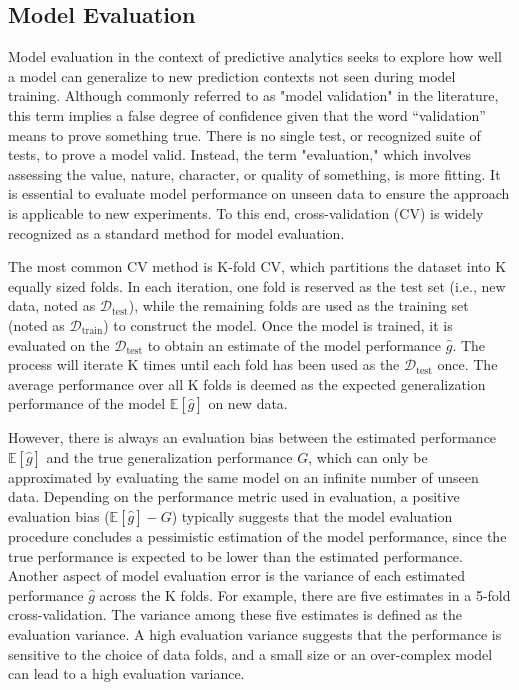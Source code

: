 \subsection{Model Evaluation}

Model evaluation in the context of predictive analytics seeks to explore how well a model can generalize to new prediction contexts not seen during model training. Although commonly referred to as "model validation" in the literature, this term implies a false degree of confidence given that the word “validation” means to prove something true. There is no single test, or recognized suite of tests, to prove a model valid. Instead, the term "evaluation," which involves assessing the value, nature, character, or quality of something, is more fitting. It is essential to evaluate model performance on unseen data to ensure the approach is applicable to new experiments. To this end, cross-validation (CV) is widely recognized as a standard method for model evaluation.

The most common CV method is K-fold CV, which partitions the dataset into K equally sized folds. In each iteration, one fold is reserved as the test set (i.e., new data, noted as $\mathcal{D}_{\text{test}}$), while the remaining folds are used as the training set (noted as $\mathcal{D}_{\text{train}}$) to construct the model. Once the model is trained, it is evaluated on the $\mathcal{D}_{\text{test}}$ to obtain an estimate of the model performance $\hat{g}$. The process will iterate K times until each fold has been used as the $\mathcal{D}_{\text{test}}$ once. The average performance over all K folds is deemed as the expected generalization performance of the model $\mathbb{E}[\hat{g}]$ on new data.

However, there is always an evaluation bias between the estimated performance $\mathbb{E}[\hat{g}]$ and the true generalization performance $G$, which can only be approximated by evaluating the same model on an infinite number of unseen data. Depending on the performance metric used in evaluation, a positive evaluation bias ($\mathbb{E}[\hat{g}] - G$) typically suggests that the model evaluation procedure concludes a pessimistic estimation of the model performance, since the true performance is expected to be lower than the estimated performance. Another aspect of model evaluation error is the variance of each estimated performance $\hat{g}$ across the K folds. For example, there are five estimates in a 5-fold cross-validation. The variance among these five estimates is defined as the evaluation variance. A high evaluation variance suggests that the performance is sensitive to the choice of data folds, and a small size or an over-complex model can lead to a high evaluation variance.

